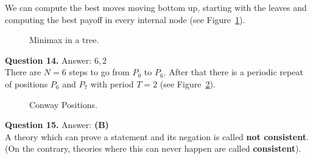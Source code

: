 \documentclass[jou]{apa6}
\begin{document}
We can compute the best moves moving bottom up, starting with the 
leaves and computing the best payoff in every internal node (see Figure~\ref{fig:minimax2}). 

\begin{figure}[!htb]
\caption{\label{fig:minimax2} Minimax in a tree.}
\end{figure}


\vspace{10pt}
{\bf Question 14.} Answer: $6,2$\\
There are $N=6$ steps to go from $P_0$ to $P_6$. 
After that there is a periodic repeat of positions $P_6$ and $P_7$ 
with period $T = 2$ (see Figure~\ref{fig:conway-line5}).


\begin{figure}[!htb]
\caption{\label{fig:conway-line5} Conway Positions.}
\end{figure}


\vspace{10pt}
{\bf Question 15.} Answer: {\bf (B)}\\

A theory which can prove a statement and its negation is called {\bf not consistent}. 
(On the contrary, theories where this can never happen are called {\bf consistent}).
\end{document}
